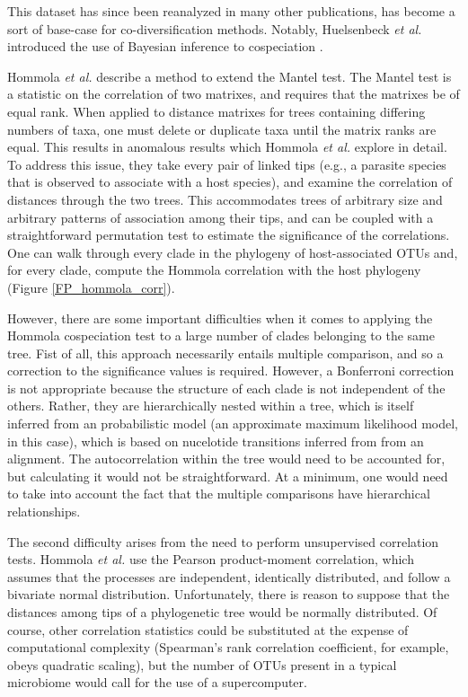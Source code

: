 This dataset has since been reanalyzed in many other publications, has become a sort of base-case for co-diversification methods. Notably, Huelsenbeck {\em et al.} introduced the use of Bayesian inference to cospeciation \cite{huelsenbeck2000bayesian}.

Hommola {\em et al.} \cite{hommola2009permutation} describe a method to extend the Mantel test. \cite{mantel1967detection} The Mantel test is a statistic on the correlation of two matrixes, and requires that the matrixes be of equal rank. When applied to distance matrixes for trees containing differing numbers of taxa, one must delete or duplicate taxa until the matrix ranks are equal. This results in anomalous results which Hommola {\em et al.} explore in detail. To address this issue, they take every pair of linked tips (e.g., a parasite species that is observed to associate with a host species), and examine the correlation of distances through the two trees. This accommodates trees of arbitrary size and arbitrary patterns of association among their tips, and can be coupled with a straightforward permutation test to estimate the significance of the correlations. One can walk through every clade in the phylogeny of host-associated OTUs and, for every clade, compute the Hommola correlation with the host phylogeny (Figure \ref{FP_hommola_corr}). 



However, there are some important difficulties when it comes to applying the Hommola cospeciation test to a large number of clades belonging to the same tree. Fist of all, this approach necessarily entails multiple comparison, and so a correction to the significance values is required. However, a Bonferroni correction is not appropriate because the structure of each clade is not independent of the others. Rather, they are hierarchically nested within a tree, which is itself inferred from an probabilistic model (an approximate maximum likelihood model, in this case), which is based on nucelotide transitions inferred from from an alignment. The autocorrelation within the tree would need to be accounted for, but calculating it would not be straightforward. At a minimum, one would need to take into account the fact that the multiple comparisons have hierarchical relationships.

The second difficulty arises from the need to perform unsupervised correlation tests. Hommola {\em et al.} use the Pearson product-moment correlation, which assumes that the processes are independent, identically distributed, and follow a bivariate normal distribution. Unfortunately, there is reason to suppose that the distances among tips of a phylogenetic tree would be normally distributed. Of course, other correlation statistics could be substituted at the expense of computational complexity (Spearman's rank correlation coefficient, for example, obeys quadratic scaling), but the number of OTUs present in a typical microbiome would call for the use of a supercomputer.

